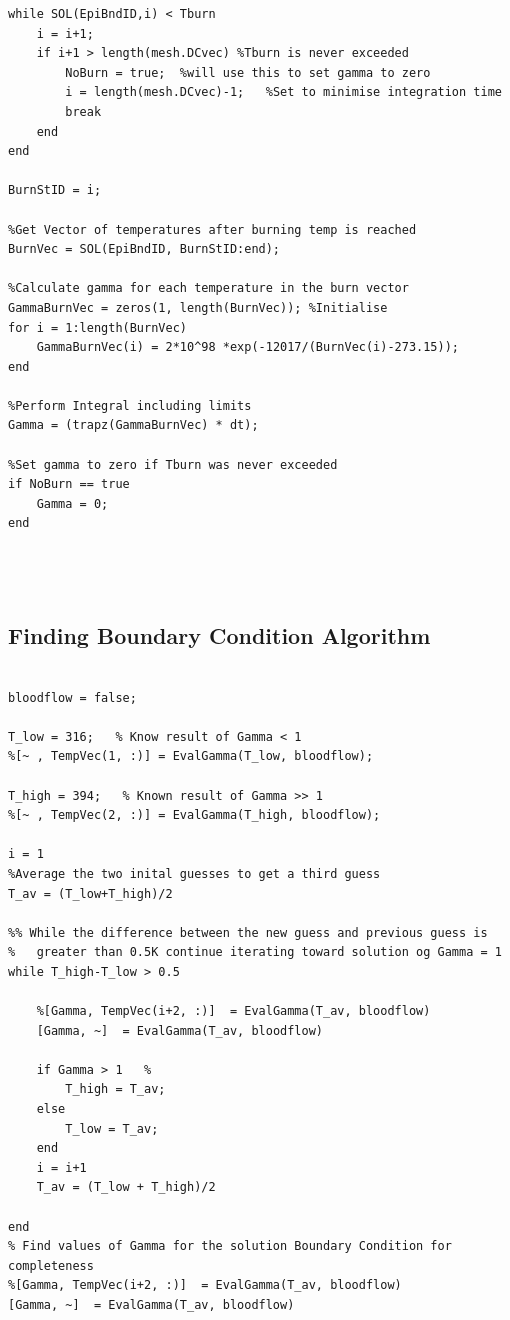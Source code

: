 \documentclass[11pt]{article}
\begin{document}
\begin{appendices}
\begin{lstlisting}
while SOL(EpiBndID,i) < Tburn
    i = i+1;
    if i+1 > length(mesh.DCvec) %Tburn is never exceeded
        NoBurn = true;  %will use this to set gamma to zero
        i = length(mesh.DCvec)-1;   %Set to minimise integration time
        break
    end
end

BurnStID = i;

%Get Vector of temperatures after burning temp is reached
BurnVec = SOL(EpiBndID, BurnStID:end);

%Calculate gamma for each temperature in the burn vector
GammaBurnVec = zeros(1, length(BurnVec)); %Initialise
for i = 1:length(BurnVec)
    GammaBurnVec(i) = 2*10^98 *exp(-12017/(BurnVec(i)-273.15));
end

%Perform Integral including limits
Gamma = (trapz(GammaBurnVec) * dt);

%Set gamma to zero if Tburn was never exceeded
if NoBurn == true
    Gamma = 0;
end
    



\end{lstlisting}

\pagebreak
\subsection{Finding Boundary Condition Algorithm} \label{ap:FindBC}
\begin{lstlisting}

bloodflow = false;

T_low = 316;   % Know result of Gamma < 1
%[~ , TempVec(1, :)] = EvalGamma(T_low, bloodflow);

T_high = 394;   % Known result of Gamma >> 1
%[~ , TempVec(2, :)] = EvalGamma(T_high, bloodflow);

i = 1
%Average the two inital guesses to get a third guess
T_av = (T_low+T_high)/2

%% While the difference between the new guess and previous guess is
%   greater than 0.5K continue iterating toward solution og Gamma = 1
while T_high-T_low > 0.5  
    
    %[Gamma, TempVec(i+2, :)]  = EvalGamma(T_av, bloodflow)
    [Gamma, ~]  = EvalGamma(T_av, bloodflow)
    
    if Gamma > 1   %
        T_high = T_av;
    else
        T_low = T_av;
    end
    i = i+1
    T_av = (T_low + T_high)/2
    
end
% Find values of Gamma for the solution Boundary Condition for completeness
%[Gamma, TempVec(i+2, :)]  = EvalGamma(T_av, bloodflow)
[Gamma, ~]  = EvalGamma(T_av, bloodflow)


\end{lstlisting}
\end{appendices}
\end{document}
